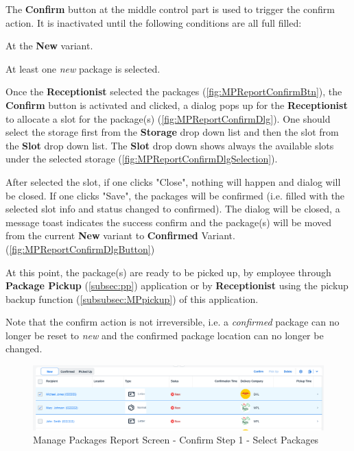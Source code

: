 The \textbf{Confirm} button at the middle control part is used to trigger the confirm action. It is inactivated until the following conditions are all full filled:

\begin{compactenum}
    \item At the \textbf{New} variant.
    \item At least one \textit{new} package is selected.
\end{compactenum}

\bigskip
Once the \textbf{Receptionist} selected the packages (\autoref{fig:MPReportConfirmBtn}), the \textbf{Confirm} button is activated and clicked, a dialog pops up for the \textbf{Receptionist} to allocate a slot for the package(s) (\autoref{fig:MPReportConfirmDlg}). One should select the storage first from the \textbf{Storage} drop down list and then the slot from the \textbf{Slot} drop down list. The \textbf{Slot} drop down shows always the available slots under the selected storage (\autoref{fig:MPReportConfirmDlgSelection}).

After selected the slot, if one clicks "Close", nothing will happen and dialog will be closed. If one clicks "Save", the packages will be confirmed (i.e. filled with the selected slot info and status changed to confirmed). The dialog will be closed, a message toast indicates the success confirm and the package(s) will be moved from the current \textbf{New} variant to \textbf{Confirmed} Variant. (\autoref{fig:MPReportConfirmDlgButton})

At this point, the package(s) are ready to be picked up, by employee through \textbf{Package Pickup} (\autoref{subsec:pp}) application or by \textbf{Receptionist} using the pickup backup function (\autoref{subsubsec:MPpickup}) of this application.

\bigskip
Note that the confirm action is not irreversible, i.e. a \textit{confirmed} package can no longer be reset to \textit{new} and the confirmed package location can no longer be changed.

\begin{figure}[H]
	\centering
	\includegraphics[width=1\linewidth]{images/user_doc/managePack/ReportScreen/browse/confirmActivated.png}
	\caption{Manage Packages Report Screen - Confirm Step 1 - Select Packages}
	\label{fig:MPReportConfirmBtn}
\end{figure}

